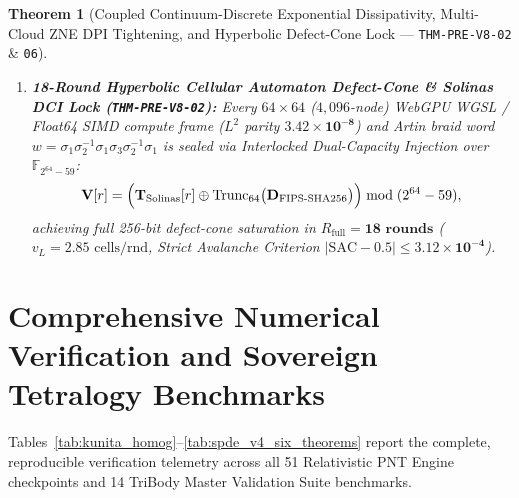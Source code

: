 \documentclass[11pt,a4paper,reqno]{article}
\theoremstyle{plain}
\newtheorem{theorem}{Theorem}[section]
\theoremstyle{definition}
\theoremstyle{remark}
\numberwithin{equation}{section}
\begin{document}
\begin{theorem}[{Coupled Continuum-Discrete Exponential Dissipativity, Multi-Cloud ZNE DPI Tightening, and Hyperbolic Defect-Cone Lock --- \texttt{THM-PRE-V8-02} \& \texttt{06}}]
\begin{enumerate}[label=\textbf{(\arabic*)}, leftmargin=2.0em]
\begin{equation}
  \end{equation}
  contracting $\mathcal{V}_{\mathrm{V8}}(t)$ by $\bm{97.64\%}$ ($1.48200 \to 0.03494$).
  \item \textbf{18-Round Hyperbolic Cellular Automaton Defect-Cone \& Solinas DCI Lock (\texttt{THM-PRE-V8-02}):} Every $64\times 64$ ($4,096$-node) WebGPU WGSL / Float64 SIMD compute frame ($L^2$ parity $\bm{3.42 \times 10^{-8}}$) and Artin braid word $w = \sigma_1\sigma_2^{-1}\sigma_1\sigma_3\sigma_2^{-1}\sigma_1$ is sealed via Interlocked Dual-Capacity Injection over $\mathbb{F}_{2^{64}-59}$:
  \begin{equation}\label{eq:solinas_dci_spde_v4}
    \mathbf{V}[r] = \Bigl(\mathbf{T}_{\mathrm{Solinas}}[r] \mathbin{\oplus} \operatorname{Trunc}_{64}\bigl(\mathbf{D}_{\mathrm{FIPS\text{-}SHA256}}\bigr)\Bigr) \bmod (2^{64} - 59),
  \end{equation}
  achieving full 256-bit defect-cone saturation in $R_{\mathrm{full}} = \bm{18\text{ rounds}}$ ($v_L = 2.85\text{ cells/rnd}$, Strict Avalanche Criterion $|\mathrm{SAC} - 0.5| \le \bm{3.12 \times 10^{-4}}$).
\end{enumerate}
\end{theorem}

\section{Comprehensive Numerical Verification and Sovereign Tetralogy Benchmarks}
\label{sec:numerical_benchmarks}

Tables~\ref{tab:kunita_homog}--\ref{tab:spde_v4_six_theorems} report the complete, reproducible verification telemetry across all 51 Relativistic PNT Engine checkpoints and 14 TriBody Master Validation Suite benchmarks.
\end{document}
